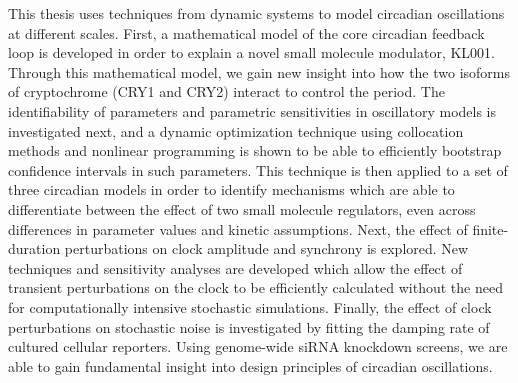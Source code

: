 This thesis uses techniques from dynamic systems to model circadian oscillations at different scales. 
First, a mathematical model of the core circadian feedback loop is developed in order to explain a novel small molecule modulator, KL001.
Through this mathematical model, we gain new insight into how the two isoforms of cryptochrome (CRY1 and CRY2) interact to control the period.
The identifiability of parameters and parametric sensitivities in oscillatory models is investigated next, and a dynamic optimization technique using collocation methods and nonlinear programming is shown to be able to efficiently bootstrap confidence intervals in such parameters.
This technique is then applied to a set of three circadian models in order to identify mechanisms which are able to differentiate between the effect of two small molecule regulators, even across differences in parameter values and kinetic assumptions.
Next, the effect of finite-duration perturbations on clock amplitude and synchrony is explored.
New techniques and sensitivity analyses are developed which allow the effect of transient perturbations on the clock to be efficiently calculated without the need for computationally intensive stochastic simulations.
Finally, the effect of clock perturbations on stochastic noise is investigated by fitting the damping rate of cultured cellular reporters.
Using genome-wide siRNA knockdown screens, we are able to gain fundamental insight into design principles of circadian oscillations.





 
